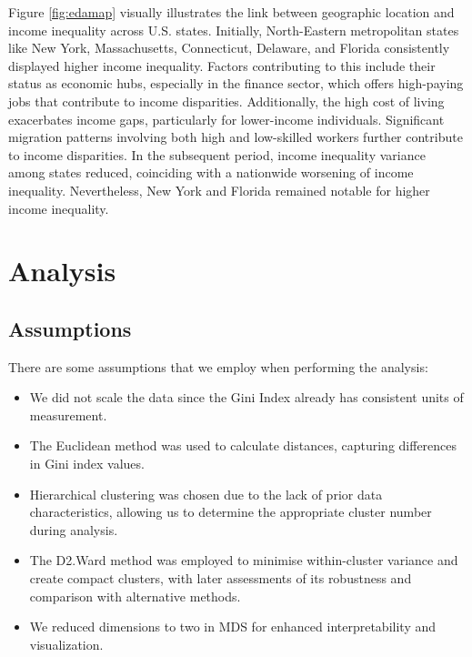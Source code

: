\documentclass[11pt,a4paper,]{article}
\providecommand{\tightlist}{%
  \setlength{\itemsep}{0pt}\setlength{\parskip}{0pt}}
\begin{document}
Figure \ref{fig:edamap} visually illustrates the link between geographic location and income inequality across U.S. states. Initially, North-Eastern metropolitan states like New York, Massachusetts, Connecticut, Delaware, and Florida consistently displayed higher income inequality. Factors contributing to this include their status as economic hubs, especially in the finance sector, which offers high-paying jobs that contribute to income disparities. Additionally, the high cost of living exacerbates income gaps, particularly for lower-income individuals. Significant migration patterns involving both high and low-skilled workers further contribute to income disparities. In the subsequent period, income inequality variance among states reduced, coinciding with a nationwide worsening of income inequality. Nevertheless, New York and Florida remained notable for higher income inequality.

\newpage

\hypertarget{analysis}{%
\section{Analysis}\label{analysis}}

\hypertarget{assumptions}{%
\subsection{Assumptions}\label{assumptions}}

There are some assumptions that we employ when performing the analysis:

\begin{itemize}
\tightlist
\item
  We did not scale the data since the Gini Index already has consistent units of measurement.
\item
  The Euclidean method was used to calculate distances, capturing differences in Gini index values.
\item
  Hierarchical clustering was chosen due to the lack of prior data characteristics, allowing us to determine the appropriate cluster number during analysis.
\item
  The D2.Ward method was employed to minimise within-cluster variance and create compact clusters, with later assessments of its robustness and comparison with alternative methods.
\item
  We reduced dimensions to two in MDS for enhanced interpretability and visualization.
\end{itemize}
\end{document}

